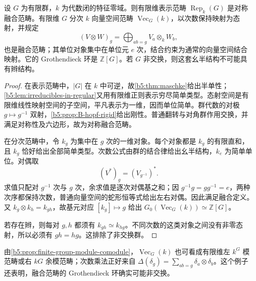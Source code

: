 \begin{proposition}\label{b5:prop:B-group-fusion}
	设 \(G\) 为有限群，\(k\) 为代数闭的特征零域。则有限维表示范畴 \(\operatorname{Rep}_k(G)\) 是对称融合范畴。有限维 \(G\) 分次 \(k\) 向量空间范畴 \(\operatorname{Vec}_G(k)\)，以次数保持映射为态射，并规定
	\[
		(V\otimes W)_g=\bigoplus_{ab=g}V_a\otimes_kW_b,
	\]
	也是融合范畴；其单位对象集中在单位元 \(e\) 次，结合约束为通常的向量空间结合映射。它的 Grothendieck 环是 \(\mathbb Z[G]\)。若 \(G\) 非交换，则这套幺半结构不可能具有辫结构。
\end{proposition}
\begin{proof}
	在表示范畴中，\(|G|\) 在 \(k\) 中可逆，故\cref{b5:thm:maschke}给出半单性；\cref{b5:lem:irreducibles-in-regular}又用有限维正则表示穷尽简单类型。态射空间是有限维线性映射空间的子空间，平凡表示为一维，因而单位简单。群代数的对极 \(g\mapsto g^{-1}\) 双射，\cref{b5:prop:B-hopf-rigid}给出刚性。普通翻转与对角群作用交换，并满足对称性及六边形，故为对称融合范畴。

	在分次范畴中，令 \(k_g\) 为集中在 \(g\) 次的一维对象。每个对象都是 \(k_g\) 的有限直和，且 \(k_g\) 恰好给出全部简单类型。次数公式由群的结合律给出幺半结构，\(k_e\) 为简单单位。对偶取
	\[
		(V^*)_g=(V_{g^{-1}})^*.
	\]
	求值只配对 \(g^{-1}\) 次与 \(g\) 次，余求值是逐次对偶基之和；因 \(g^{-1}g=gg^{-1}=e\)，两种次序都保持次数，普通向量空间的蛇形恒等式给出左右对偶。因此满足融合定义。又 \(k_g\otimes k_h=k_{gh}\)，故基元对应 \([k_g]\mapsto g\) 给出 \(G_0(\operatorname{Vec}_G(k))\simeq\mathbb Z[G]\)。

	若存在辫，则每对 \(g,h\) 都须有 \(k_{gh}\simeq k_{hg}\)。不同次数的这类对象之间没有非零态射，所以必须有 \(gh=hg\)。这排除了非交换群。
\end{proof}

由\cref{b5:prop:finite-group-module-comodule}，\(\operatorname{Vec}_G(k)\) 也可看成有限维左 \(k^G\) 模范畴或右 \(kG\) 余模范畴；次数乘法正好来自 \(\Delta(\delta_g)=\sum_{ab=g}\delta_a\otimes\delta_b\)。这个例子还表明，融合范畴的 Grothendieck 环确实可能非交换。

